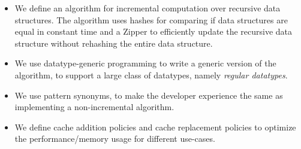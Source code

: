 \begin{itemize}
    \item We define an algorithm for incremental computation over recursive data structures. The algorithm uses hashes for comparing if data structures are equal in constant time and a Zipper to efficiently update the recursive data structure without rehashing the entire data structure.
    \item We use datatype-generic programming to write a generic version of the algorithm, to support a large class of datatypes, namely \textit{regular datatypes}.
    \item We use pattern synonyms, to make the developer experience the same as implementing a non-incremental algorithm.
    \item We define cache addition policies and cache replacement policies to optimize the performance/memory usage for different use-cases.
\end{itemize}


